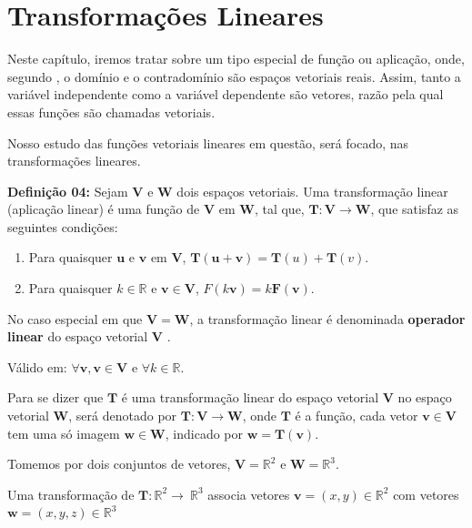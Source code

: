 \chapter{Transformações Lineares}
Neste capítulo, iremos tratar sobre um tipo especial de função ou aplicação, onde, segundo \cite{steinbruch1987}, o domínio e o contradomínio são espaços vetoriais reais. Assim, tanto a variável independente como a variável dependente são vetores, razão pela qual essas funções são chamadas vetoriais.

Nosso estudo das funções vetoriais lineares em questão, será focado, nas transformações lineares.

\noindent\textbf{Definição 04:} Sejam $\mathbf{V}$ e $\mathbf{W}$ dois espaços vetoriais. Uma transformação linear (aplicação linear) é uma função de $\mathbf{V}$ em $\mathbf{W}$, tal que, $\mathbf{T}: \mathbf{V} \rightarrow \mathbf{W}$, que satisfaz as seguintes condições:

\begin{enumerate}
	\item Para quaisquer $\mathbf{u}$ e $\mathbf{v}$ em $\mathbf{V}$, $\mathbf{T}(\mathbf{u} + \mathbf{v}) = \mathbf{T}(u) + \mathbf{T}(v)$.
	\item Para quaisquer $k \in \mathbb{R}$ e $\mathbf{v} \in \mathbf{V}$, $F(k\mathbf{v}) = k\mathbf{F}(\mathbf{v})$.
\end{enumerate}	

No caso especial em que $\mathbf{V} = \mathbf{W}$, a transformação linear é denominada \textbf{operador linear} do espaço vetorial $\mathbf{V}$ \cite{anton2010elementary}.

\noindent\centerline{Válido em: $\forall \mathbf{v}, \mathbf{v} \in \mathbf{V}$ e $\forall k \in \mathbb{R}$. }

Para se dizer que $\mathbf{T}$ é uma transformação linear do espaço vetorial $\mathbf{V}$ no espaço vetorial $\mathbf{W}$, será denotado por $\mathbf{T}:\mathbf{V}\longrightarrow\mathbf{W}$, onde $\mathbf{T}$ é a função, cada vetor $\mathbf{v} \in \mathbf{V}$ tem uma só imagem $\mathbf{w} \in \mathbf{W}$, indicado por $\mathbf{w} = \mathbf{T}(\mathbf{v})$.

Tomemos por dois conjuntos de vetores, $\mathbf{V} = \mathbb{R}^2$ e $\mathbf{W} = \mathbb{R}^3$.

Uma transformação de $\mathbf{T}:\mathbb{R}^2\longrightarrow\ \mathbb{R}^3$ associa vetores $\mathbf{v} = (x, y) \in \mathbb{R}^2$ com vetores $\mathbf{w} = (x, y, z) \in \mathbb{R}^3$

